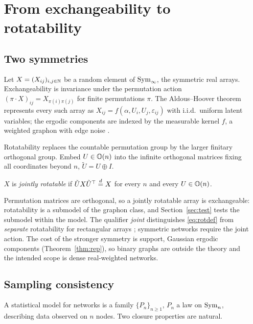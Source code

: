 \section{From exchangeability to rotatability}
\label{sec:setup}

\subsection{Two symmetries}

Let $X=(X_{ij})_{i,j\in\mathbb{N}}$ be a random element of $\mathrm{Sym}_\infty$, the
symmetric real arrays. Exchangeability is invariance under the permutation
action $(\pi\cdot X)_{ij}=X_{\pi(i)\pi(j)}$ for finite permutations $\pi$.
The Aldous--Hoover theorem represents every such array as
$X_{ij}=f(\alpha,U_i,U_j,\varepsilon_{ij})$ with i.i.d.\ uniform latent
variables; the ergodic components are indexed by the measurable kernel $f$, a
weighted graphon with edge noise
\citep{aldous1981representations,hoover1979relations}.

Rotatability replaces the countable permutation group by the larger
finitary orthogonal group. Embed $U\in\mathbb{O}(n)$ into the infinite orthogonal matrices
fixing all coordinates beyond $n$, $\tilde U=U\oplus I$.

\begin{definition}
\label{def:rot}
$X$ is \emph{jointly rotatable} if $\tilde U X \tilde U^\top \overset{d}{=} X$ for
every $n$ and every $U\in\mathbb{O}(n)$.
\end{definition}

Permutation matrices are orthogonal, so a jointly rotatable array is
exchangeable: rotatability is a submodel of the graphon class, and
Section~\ref{sec:test} tests the submodel within the model. The
qualifier \emph{joint} distinguishes \eqref{eq:rotdef} from
\emph{separate} rotatability for rectangular arrays
\citep{aldous1981representations}; symmetric networks require the
joint action. The cost of the stronger symmetry is support, Gaussian
ergodic components (Theorem~\ref{thm:rep}), so binary graphs are
outside the theory and the intended scope is dense real-weighted
networks.

\subsection{Sampling consistency}
\label{sec:consistency}

A statistical model for networks is a family $\{P_n\}_{n\ge1}$, $P_n$ a law
on $\mathrm{Sym}_n$, describing data observed on $n$ nodes. Two closure properties
are natural.

